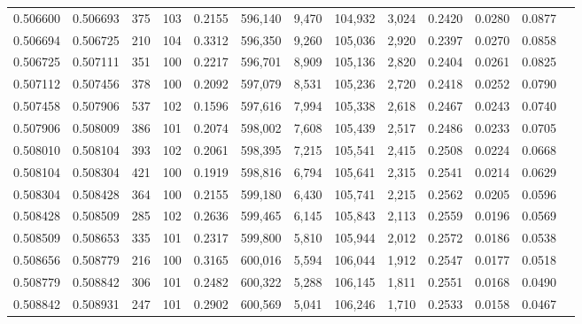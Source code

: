 \begin{tabular}{rrrrrrrrrrrrr}
0.506600 & 0.506693 &   375 & 103 &                                     0.2155 & 596,140 &   9,470 & 104,932 &   3,024 & 0.2420 & 0.0280 & 0.0877 \\
0.506694 & 0.506725 &   210 & 104 &                                     0.3312 & 596,350 &   9,260 & 105,036 &   2,920 & 0.2397 & 0.0270 & 0.0858 \\
0.506725 & 0.507111 &   351 & 100 &                                     0.2217 & 596,701 &   8,909 & 105,136 &   2,820 & 0.2404 & 0.0261 & 0.0825 \\
0.507112 & 0.507456 &   378 & 100 &                                     0.2092 & 597,079 &   8,531 & 105,236 &   2,720 & 0.2418 & 0.0252 & 0.0790 \\
0.507458 & 0.507906 &   537 & 102 &                                     0.1596 & 597,616 &   7,994 & 105,338 &   2,618 & 0.2467 & 0.0243 & 0.0740 \\
0.507906 & 0.508009 &   386 & 101 &                                     0.2074 & 598,002 &   7,608 & 105,439 &   2,517 & 0.2486 & 0.0233 & 0.0705 \\
0.508010 & 0.508104 &   393 & 102 &                                     0.2061 & 598,395 &   7,215 & 105,541 &   2,415 & 0.2508 & 0.0224 & 0.0668 \\
0.508104 & 0.508304 &   421 & 100 &                                     0.1919 & 598,816 &   6,794 & 105,641 &   2,315 & 0.2541 & 0.0214 & 0.0629 \\
0.508304 & 0.508428 &   364 & 100 &                                     0.2155 & 599,180 &   6,430 & 105,741 &   2,215 & 0.2562 & 0.0205 & 0.0596 \\
0.508428 & 0.508509 &   285 & 102 &                                     0.2636 & 599,465 &   6,145 & 105,843 &   2,113 & 0.2559 & 0.0196 & 0.0569 \\
0.508509 & 0.508653 &   335 & 101 &                                     0.2317 & 599,800 &   5,810 & 105,944 &   2,012 & 0.2572 & 0.0186 & 0.0538 \\
0.508656 & 0.508779 &   216 & 100 &                                     0.3165 & 600,016 &   5,594 & 106,044 &   1,912 & 0.2547 & 0.0177 & 0.0518 \\
0.508779 & 0.508842 &   306 & 101 &                                     0.2482 & 600,322 &   5,288 & 106,145 &   1,811 & 0.2551 & 0.0168 & 0.0490 \\
0.508842 & 0.508931 &   247 & 101 &                                     0.2902 & 600,569 &   5,041 & 106,246 &   1,710 & 0.2533 & 0.0158 & 0.0467 \\

\end{tabular}
